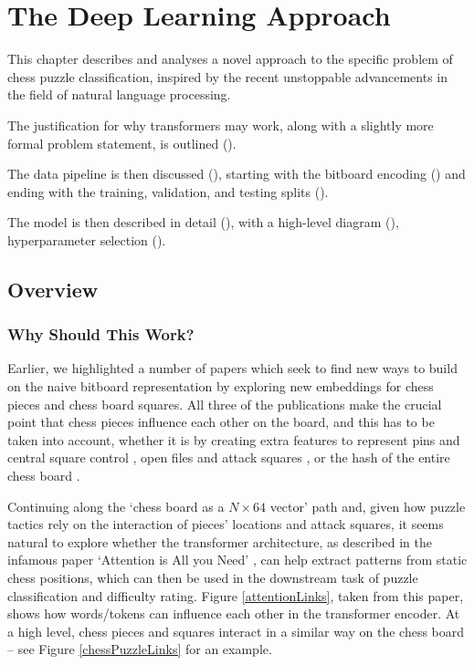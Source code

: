 \chapter{The Deep Learning Approach}\label{mlChapter}

This chapter describes and analyses a novel approach to the specific problem of
chess puzzle classification, inspired by the recent unstoppable advancements in
the field of natural language processing.

The justification for why transformers may work, along with a slightly more
formal problem statement, is outlined ().

The data pipeline is then discussed (), starting with the bitboard
encoding () and ending with the training, validation, and testing
splits ().

The model is then described in detail (), with a high-level diagram
(), hyperparameter selection ().

\section{Overview}\label{mlS0}

\subsection{Why Should This Work?}

Earlier, we highlighted a number of papers which seek to find new ways to build
on the naive bitboard representation \citep{middleGamePatterns, chessCNN,
chess2vec} by exploring new embeddings for chess pieces and chess board
squares. All three of the publications make the crucial point that chess pieces
influence each other on the board, and this has to be taken into account,
whether it is by creating extra features to represent pins and central square
control \citep{chessCNN}, open files and attack squares
\citep{middleGamePatterns}, or the hash of the entire chess board
\cite{chess2vec}.

Continuing along the `chess board as a $N\times64$ vector' path and, given how
puzzle tactics rely on the interaction of pieces' locations and attack squares,
it seems natural to explore whether the transformer architecture, as described
in the infamous paper `Attention is All you Need' \citep{attention}, can help
extract patterns from static chess positions, which can then be used in the
downstream task of puzzle classification and difficulty rating. Figure
\ref{attentionLinks}, taken from this paper, shows how words/tokens can
influence each other in the transformer encoder. At a high level, chess pieces
and squares interact in a similar way on the chess board -- see Figure
\ref{chessPuzzleLinks} for an example.

